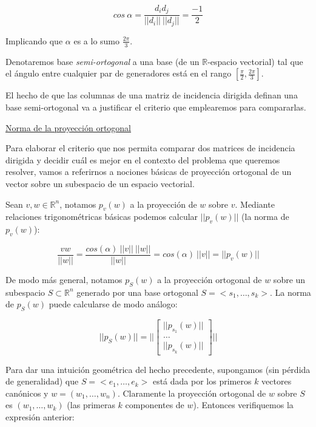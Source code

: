 \documentclass[a4paper,11pt]{article}
\begin{document}
$$cos \ \alpha = \frac{d_i d_j}{||d_i|| \ ||d_j||} = \frac{-1}{2}$$

\bigskip

Implicando que $\alpha$ es a lo sumo $\frac{2\pi}{3}$.

\bigskip

Denotaremos base \textit{semi-ortogonal} a una base (de un 
$\mathbb{R}$-espacio vectorial) tal que el ángulo entre cualquier par de 
generadores está en el rango $[\frac{\pi}{2},\frac{2\pi}{3}]$.

\bigskip

El hecho de que las columnas de una matriz de incidencia dirigida 
definan una base semi-ortogonal va a justificar el criterio que 
emplearemos para compararlas.

\bigskip

\underline{Norma de la proyección ortogonal}

\bigskip

Para elaborar el criterio que nos permita comparar dos matrices de 
incidencia dirigida y decidir cuál es mejor en el contexto del problema 
que queremos resolver, vamos a referirnos a nociones básicas de 
proyección ortogonal de un vector sobre un subespacio de un espacio 
vectorial.

\bigskip

Sean $v,w \in \mathbb{R}^n$, notamos $p_v(w)$ a la proyección de $w$ 
sobre $v$. Mediante relaciones trigonométricas básicas podemos 
calcular $||p_v(w)||$ (la norma de $p_v(w)$):

$$\frac{v w}{||w||} = \frac{cos(\alpha) \ ||v|| \ ||w||}{||w||} = 
cos(\alpha) \ ||v|| = ||p_v(w)||$$

\bigskip

De modo más general, notamos $p_S(w)$ a la proyección ortogonal de $w$
sobre un subespacio $S \subset \mathbb{R}^n$ generado por una base 
ortogonal $S = <s_1, \dots, s_k>$. La norma de $p_S(w)$ puede calcularse
de modo análogo:

$$
||p_S(w)|| = ||\begin{bmatrix}
	||p_{s_1}(w)|| \\
	\dots \\
	||p_{s_k}(w)||
\end{bmatrix}||
$$

\bigskip

Para dar una intuición geométrica del hecho precedente, supongamos (sin 
pérdida de generalidad) que $S = <e_1, \dots, e_k>$ está dada por los 
primeros $k$ vectores canónicos y $w = (w_1, \dots, w_n)$. 
Claramente la proyección ortogonal de $w$ sobre $S$ es 
$(w_1, \dots, w_k)$ (las primeras $k$ componentes de $w$). Entonces 
verifiquemos la expresión anterior:
\end{document}
